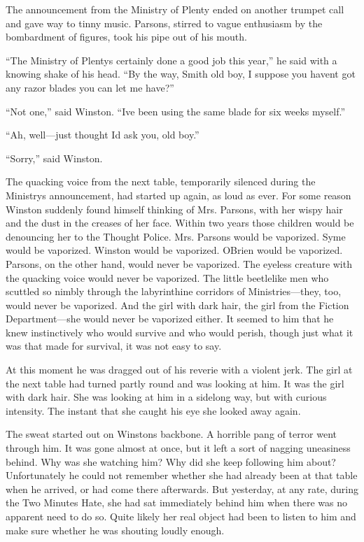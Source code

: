 The announcement from the Ministry of Plenty ended on another trumpet
call and gave way to tinny music. Parsons, stirred to vague enthusiasm
by the bombardment of figures, took his pipe out of his mouth.

``The Ministry of Plenty\textquotesingle s certainly done a good job this
year,'' he said with a knowing shake of his head. ``By the way, Smith old
boy, I suppose you haven\textquotesingle t got any razor blades you can
let me have?''

``Not one,'' said Winston. ``I\textquotesingle ve been using the same blade
for six weeks myself.''

``Ah, well---just thought I\textquotesingle d ask you, old boy.''

``Sorry,'' said Winston.

The quacking voice from the next table, temporarily silenced during the
Ministry\textquotesingle s announcement, had started up again, as loud
as ever. For some reason Winston suddenly found himself thinking of Mrs.
Parsons, with her wispy hair and the dust in the creases of her face.
Within two years those children would be denouncing her to the Thought
Police. Mrs. Parsons would be vaporized. Syme would be vaporized.
Winston would be vaporized. O\textquotesingle Brien would be vaporized.
Parsons, on the other hand, would never be vaporized. The eyeless
creature with the quacking voice would never be vaporized. The little
beetlelike men who scuttled so nimbly through the labyrinthine corridors
of Ministries---they, too, would never be vaporized. And the girl with
dark hair, the girl from the Fiction Department---she would never be
vaporized either. It seemed to him that he knew instinctively who would
survive and who would perish, though just what it was that made for
survival, it was not easy to say.

At this moment he was dragged out of his reverie with a violent jerk.
The girl at the next table had turned partly round and was looking at
him. It was the girl with dark hair. She was looking at him in a
sidelong way, but with curious intensity. The instant that she caught
his eye she looked away again.

The sweat started out on Winston\textquotesingle s backbone. A horrible
pang of terror went through him. It was gone almost at once, but it left
a sort of nagging uneasiness behind. Why was she watching him? Why did
she keep following him about? Unfortunately he could not remember
whether she had already been at that table when he arrived, or had come
there afterwards. But yesterday, at any rate, during the Two Minutes
Hate, she had sat immediately behind him when there was no apparent need
to do so. Quite likely her real object had been to listen to him and
make sure whether he was shouting loudly enough.

